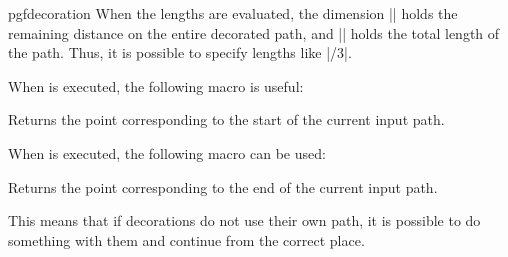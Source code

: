 \begin{environment}{{pgfdecoration}}
    When the lengths are evaluated, the dimension
    |\pgfdecoratedremainingdistance| holds the remaining distance on the entire
    decorated path, and |\pgfdecoratedpathlength| holds the total length of the
    path. Thus, it is possible to specify lengths like
    |\pgfdecoratedpathlength/3|.
\begin{codeexample}[]
\end{codeexample}

    When  is executed, the following macro is useful:
    \begin{command}{\pgfpointdecoratedpathfirst}
        Returns the point corresponding to the start of the current input path.
    \end{command}
    When  is executed, the following macro can be used:
    \begin{command}{\pgfpointdecoratedpathlast}
        Returns the point corresponding to the end of the current input path.
    \end{command}
    This means that if decorations do not use their own path, it is possible to
    do something with them and continue from the correct place.
\begin{codeexample}[]
\end{codeexample}


\end{environment}
